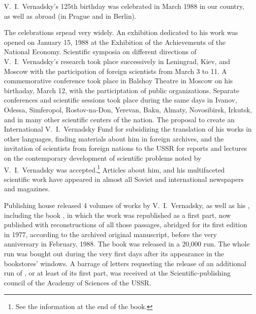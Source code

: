 V.~I.\ Vernadsky's 125th birthday was celebrated in March 1988 in our country,
as well as abroad (in Prague and in Berlin).

The celebrations srpead very widely.  An exhibition dedicated to his work was
opened on January 15, 1988 at the Exhibition of the Achievements of the
National Economy.  Scientific symposia on different directions of V.~I.\ Vernadsky's
research took place successively in Leningrad, Kiev, and Moscow with the
participation of foreign scientists from March 3 to 11.  A commemorative
conference took place in Balshoy Theatre in Moscow
on his birthaday, March 12, with the participtation of public organizations.
Separate conferences and scientific sessions took place during the same days in
Ivanov, Odessa, Simferopol, Rostov-na-Don, Yerevan, Baku,
Almaty, Novosibirsk, Irkutsk, and in many other
scientific centers of the nation.  The proposal to create an International
V.~I.\ Vernadsky Fund for
subsidizing the translation of his works in other languages, finding materials
about him in foreign archives, and the invitation of scientists from foreign
nations to the USSR for reports and lectures on the contemporary development of
scientific problems noted by V.~I.\ Vernadsky was accepted.\footnote{See the
information at the end of the book.}  Articles about him, and his multifaceted
scientific work have appeared in almost all Soviet and international newspapers
and magazines.

Publishing house  released 4 volumes of works
by V.~I.\ Vernadsky, as well as his , including the
book , in which the work  was republished as a first part, now
published with reconstructions of all those passages, abridged for its first
edition in 1977, according to the archived original manuscript, before the very
anniversary in February, 1988.  The book was released in a 20,000 run.  The
whole run was bought out during the very first days after its appearance in the
bookstores' windows.  A barrage of letters requesting the release of an
additional run of , or at least of its first
part, was received at the Scientific-publishing council of the Academy of
Sciences of the USSR.

